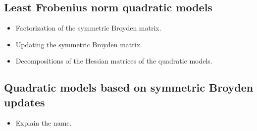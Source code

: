 \subsection{Least Frobenius norm quadratic models}

\begin{itemize}
    \item Factorization of the symmetric Broyden matrix.
    \item Updating the symmetric Broyden matrix.
    \item Decompositions of the Hessian matrices of the quadratic models.
\end{itemize}

\subsection{Quadratic models based on symmetric Broyden updates}

\begin{itemize}
    \item Explain the name.
\end{itemize}
